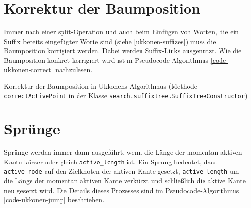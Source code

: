 \section{Korrektur der Baumposition}
\label{ukkonen-correct}

\paragraph{} Immer nach einer split-Operation und auch beim Einfügen von Worten, die ein Suffix bereits eingefügter Worte sind (siehe \ref{ukkonen-suffizes}) muss die Baumposition korrigiert werden. Dabei werden Suffix-Links ausgenutzt. Wie die Baumposition konkret korrigiert wird ist in Pseudocode-Algorithmus \ref{code-ukkonen-correct} nachzulesen.

\begin{algorithm}[H]
\caption{Korrektur der Baumposition in Ukkonens Algorithmus (Methode \texttt{correctActivePoint} in der Klasse \texttt{search.suffixtree.SuffixTreeConstructor})}
\label{code-ukkonen-correct}
\begin{algorithmic}
	\ELSE
	\ENDIF
\ELSE
	\ELSE
	\ENDIF
\ENDIF
{}
\end{algorithmic}
\end{algorithm}

\section{Sprünge}
\label{ukkonen-jumps}

\paragraph{} Sprünge werden immer dann ausgeführt, wenn die Länge der momentan aktiven Kante kürzer oder gleich \texttt{active\_length} ist. Ein Sprung bedeutet, dass \texttt{active\_node} auf den Zielknoten der aktiven Kante gesetzt, \texttt{active\_length} um die Länge der momentan aktiven Kante verkürzt und schließlich die aktive Kante neu gesetzt wird. Die Details dieses Prozesses sind im Pseudocode-Algorithmus \ref{code-ukkonen-jump} beschrieben.

